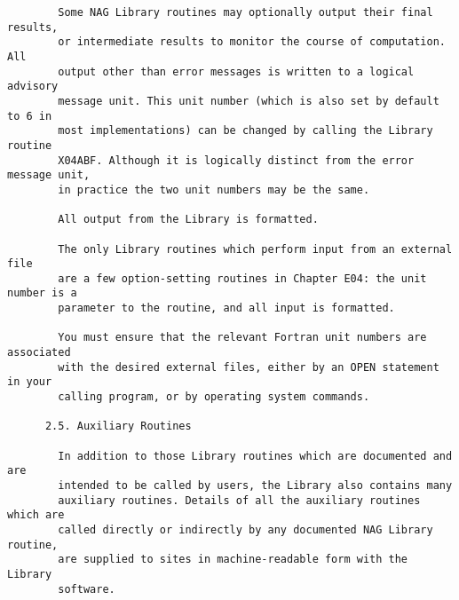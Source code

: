 \begin{small}
\begin{verbatim}
        Some NAG Library routines may optionally output their final results,      
        or intermediate results to monitor the course of computation. All         
        output other than error messages is written to a logical advisory         
        message unit. This unit number (which is also set by default to 6 in      
        most implementations) can be changed by calling the Library routine       
        X04ABF. Although it is logically distinct from the error message unit,    
        in practice the two unit numbers may be the same.                         
                                                                                  
        All output from the Library is formatted.                                 
                                                                                  
        The only Library routines which perform input from an external file       
        are a few option-setting routines in Chapter E04: the unit number is a    
        parameter to the routine, and all input is formatted.                     
                                                                                  
        You must ensure that the relevant Fortran unit numbers are associated     
        with the desired external files, either by an OPEN statement in your      
        calling program, or by operating system commands.                         
                                                                                  
      2.5. Auxiliary Routines                                                     
                                                                                  
        In addition to those Library routines which are documented and are        
        intended to be called by users, the Library also contains many            
        auxiliary routines. Details of all the auxiliary routines which are       
        called directly or indirectly by any documented NAG Library routine,      
        are supplied to sites in machine-readable form with the Library           
        software.                                                                 
                                                                                  

\end{verbatim}
\end{small}
